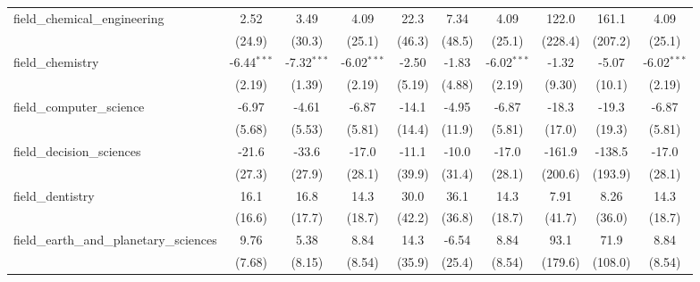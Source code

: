 \begin{tabular}{lccccccccc}
   field\_chemical\_engineering                                & 2.52          & 3.49          & 4.09          & 22.3         & 7.34         & 4.09          & 122.0        & 161.1   & 4.09\\   
                                                               & (24.9)        & (30.3)        & (25.1)        & (46.3)       & (48.5)       & (25.1)        & (228.4)      & (207.2) & (25.1)\\   
   field\_chemistry                                            & -6.44$^{***}$ & -7.32$^{***}$ & -6.02$^{***}$ & -2.50        & -1.83        & -6.02$^{***}$ & -1.32        & -5.07   & -6.02$^{***}$\\   
                                                               & (2.19)        & (1.39)        & (2.19)        & (5.19)       & (4.88)       & (2.19)        & (9.30)       & (10.1)  & (2.19)\\   
   field\_computer\_science                                    & -6.97         & -4.61         & -6.87         & -14.1        & -4.95        & -6.87         & -18.3        & -19.3   & -6.87\\   
                                                               & (5.68)        & (5.53)        & (5.81)        & (14.4)       & (11.9)       & (5.81)        & (17.0)       & (19.3)  & (5.81)\\   
   field\_decision\_sciences                                   & -21.6         & -33.6         & -17.0         & -11.1        & -10.0        & -17.0         & -161.9       & -138.5  & -17.0\\   
                                                               & (27.3)        & (27.9)        & (28.1)        & (39.9)       & (31.4)       & (28.1)        & (200.6)      & (193.9) & (28.1)\\   
   field\_dentistry                                            & 16.1          & 16.8          & 14.3          & 30.0         & 36.1         & 14.3          & 7.91         & 8.26    & 14.3\\   
                                                               & (16.6)        & (17.7)        & (18.7)        & (42.2)       & (36.8)       & (18.7)        & (41.7)       & (36.0)  & (18.7)\\   
   field\_earth\_and\_planetary\_sciences                      & 9.76          & 5.38          & 8.84          & 14.3         & -6.54        & 8.84          & 93.1         & 71.9    & 8.84\\   
                                                               & (7.68)        & (8.15)        & (8.54)        & (35.9)       & (25.4)       & (8.54)        & (179.6)      & (108.0) & (8.54)\\   

\end{tabular}
